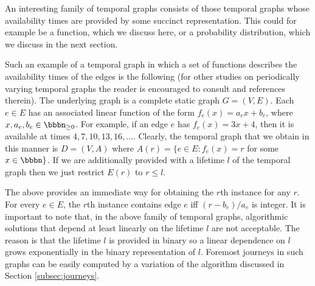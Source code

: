 \documentclass[oribibl, 11pt]{llncs}
\begin{document}
An interesting family of temporal graphs consists of those temporal graphs whose availability times are provided by some succinct representation. This could for example be a function, which we discuss here, or a probability distribution, which we discuss in the next section.

Such an example of a temporal graph in which a set of functions describes the availability times of the edges is the following (for other studies on periodically varying temporal graphs the reader is encouraged to consult \cite{Or81,FMS09,CFQS12} and references therein). The underlying graph is a complete static graph $G=(V,E)$. Each $e\in E$ has an associated linear function of the form $f_e(x)=a_ex+b_e$, where $x,a_e,b_e\in\bbbn_{\geq 0}$. For example, if an edge $e$ has $f_e(x)=3x+4$, then it is available at times $4,7,10,13,16,\ldots$. Clearly, the temporal graph that we obtain in this manner is $D=(V,A)$ where $A(r)=\{e\in E:f_e(x)=r$ for some $x\in\bbbn\}$. If we are additionally provided with a lifetime $l$ of the temporal graph then we just restrict $E(r)$ to $r\leq l$.

The above provides an immediate way for obtaining the $r$th instance for any $r$. For every $e\in E$, the $r$th instance contains edge $e$ iff $(r-b_e)/a_e$ is integer. It is important to note that, in the above family of temporal graphs, algorithmic solutions that depend at least linearly on the lifetime $l$ are not acceptable. The reason is that the lifetime $l$ is provided in binary so a linear dependence on $l$ grows exponentially in the binary representation of $l$. Foremost journeys in such graphs can be easily computed by a variation of the algorithm discussed in Section \ref{subsec:journeys}.
\end{document}
